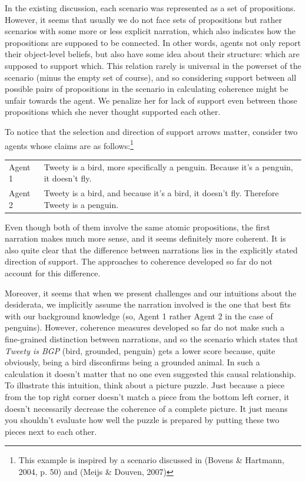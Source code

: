 \documentclass[10pt,]{scrartcl}
\begin{document}
In the existing discussion, each scenario was represented as a set of
propositions. However, it seems that usually we do not face sets of
propositions but rather scenarios with some more or less explicit
narration, which also indicates how the propositions are supposed to be
connected. In other words, agents not only report their object-level
beliefs, but also have some idea about their structure: which are
supposed to support which. This relation rarely is universal in the
powerset of the scenario (minus the empty set of course), and so
considering support between all possible pairs of propositions in the
scenario in calculating coherence might be unfair towards the agent. We
penalize her for lack of support even between those propositions which
she never thought supported each other.

To notice that the selection and direction of support arrows matter, 
consider two agents whose claims are as follows:\footnote{This example is inspired by a scenario discussed in (Bovens \& Hartmann, 2004, p. 50) and (Meijs \&
Douven, 2007)}  

\vspace{2mm}

\begin{center}
\begin{tabular}{lp{9cm}}
\textsf{Agent 1}     & Tweety is a bird, more specifically a penguin. Because it’s a penguin, it doesn’t fly.  \\
\textsf{Agent 2}     &  Tweety is a bird, and because it’s a bird, it doesn't fly. Therefore Tweety is a penguin. \\
\end{tabular}
\end{center}

\vspace{2mm}

\noindent Even though both of them involve the same atomic propositions,
the first narration makes much more sense, and it seems definitely more
coherent. It is also quite clear that the difference between narrations
lies in the explicitly stated direction of support. The approaches to
coherence developed so far do not account for this difference.

Moreover, it seems that when we present challenges and our intuitions
about the desiderata, we implicitly assume the narration involved is the
one that best fits with our background knowledge (so, Agent 1 rather
Agent 2 in the case of penguins). However, coherence measures developed
so far do not make such a fine-grained distinction between narrations,
and so the scenario which states that \textit{Tweety is BGP} (bird,
grounded, penguin) gets a lower score because, quite obviously, being a
bird disconfirms being a grounded animal. In such a calculation it
doesn't matter that no one even suggested this causal relationship. To
illustrate this intuition, think about a picture puzzle. Just because a
piece from the top right corner doesn't match a piece from the bottom
left corner, it doesn't necessarily decrease the coherence of a complete
picture. It just means you shouldn't evaluate how well the puzzle is
prepared by putting these two pieces next to each other.
\end{document}
